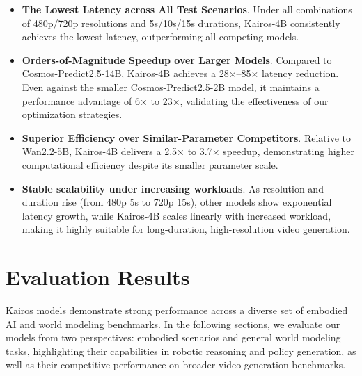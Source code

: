 \documentclass{llmxive}
\begin{document}
\begin{itemize}

    \item \textbf{The Lowest Latency across All Test Scenarios}. Under all combinations of 480p/720p resolutions and 5s/10s/15s durations, Kairos-4B consistently achieves the lowest latency, outperforming all competing models.

    \item \textbf{Orders-of-Magnitude Speedup over Larger Models}. Compared to Cosmos-Predict2.5-14B, Kairos-4B achieves a 28×–85× latency reduction. Even against the smaller Cosmos-Predict2.5-2B model, it maintains a performance advantage of 6× to 23×, validating the effectiveness of our optimization strategies.
    
    \item \textbf{Superior Efficiency over Similar-Parameter Competitors}. Relative to Wan2.2-5B, Kairos-4B delivers a 2.5× to 3.7× speedup, demonstrating higher computational efficiency despite its smaller parameter scale.
    
    \item \textbf{Stable scalability under increasing workloads}. As resolution and duration rise (from 480p 5s to 720p 15s), other models show exponential latency growth, while Kairos-4B scales linearly with increased workload, making it highly suitable for long-duration, high-resolution video generation.    
    
\end{itemize}    






\section{Evaluation Results}
Kairos models demonstrate strong performance across a diverse set of embodied AI and world modeling benchmarks. In the following sections, we evaluate our models from two perspectives: embodied scenarios and general world modeling tasks, highlighting their capabilities in robotic reasoning and policy generation, as well as their competitive performance on broader video generation benchmarks.
\end{document}
